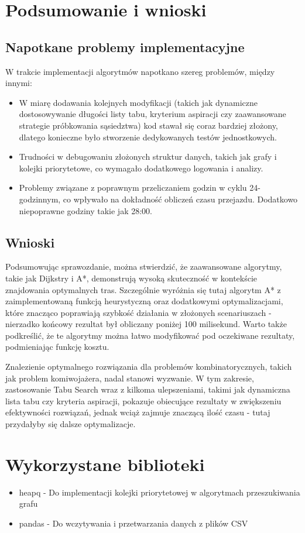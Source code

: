 \documentclass[12pt,a4paper]{article}
\begin{document}
\section{Podsumowanie i wnioski}

\subsection{Napotkane problemy implementacyjne}

W trakcie implementacji algorytmów napotkano szereg problemów, między innymi:
\begin{itemize}
    \item W miarę dodawania kolejnych modyfikacji (takich jak dynamiczne dostosowywanie długości listy tabu, kryterium aspiracji czy zaawansowane strategie próbkowania sąsiedztwa) kod stawał się coraz bardziej złożony, dlatego konieczne było stworzenie dedykowanych testów jednostkowych.
    \item Trudności w debugowaniu złożonych struktur danych, takich jak grafy i kolejki priorytetowe, co wymagało dodatkowego logowania i analizy.
    \item Problemy związane z poprawnym przeliczaniem godzin w cyklu 24-godzinnym, co wpływało na dokładność obliczeń czasu przejazdu. Dodatkowo niepoprawne godziny takie jak 28:00.
\end{itemize}

\subsection{Wnioski}
Podsumowując sprawozdanie, można stwierdzić, że zaawansowane algorytmy, takie jak Dijkstry i A*, demonstrują wysoką skuteczność w kontekście znajdowania optymalnych tras. Szczególnie wyróżnia się tutaj algorytm A* z zaimplementowaną funkcją heurystyczną oraz dodatkowymi optymalizacjami, które znacząco poprawiają szybkość działania w złożonych scenariuszach - nierzadko końcowy rezultat był obliczany poniżej 100 milisekund. Warto także podkreślić, że te algorytmy można łatwo modyfikować pod oczekiwane rezultaty, podmieniając funkcję kosztu.

Znalezienie optymalnego rozwiązania dla problemów kombinatorycznych, takich jak problem komiwojażera, nadal stanowi wyzwanie. W tym zakresie, zastosowanie Tabu Search wraz z kilkoma ulepszeniami, takimi jak dynamiczna lista tabu czy kryteria aspiracji, pokazuje obiecujące rezultaty w zwiększeniu efektywności rozwiązań, jednak wciąż zajmuje znaczącą ilość czasu - tutaj przydałyby się dalsze optymalizacje.

\section{Wykorzystane biblioteki}

\begin{itemize}
    \item heapq - Do implementacji kolejki priorytetowej w algorytmach przeszukiwania grafu
    \item pandas - Do wczytywania i przetwarzania danych z plików CSV
\end{itemize}
\end{document}
